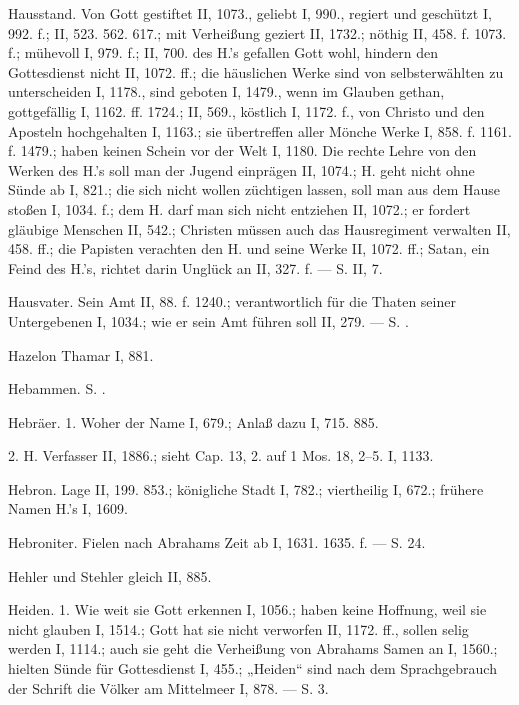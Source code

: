 Hausstand. Von Gott gestiftet II, 1073., geliebt I, 990., regiert und geschützt I, 992. f.; II, 523. 562. 617.; mit Verheißung geziert II, 1732.; nöthig II, 458. f. 1073. f.; mühevoll I, 979. f.; II, 700.  des H.’s gefallen Gott wohl, hindern den Gottesdienst nicht II, 1072. ff.; die häuslichen Werke sind von selbsterwählten zu unterscheiden I, 1178., sind geboten I, 1479., wenn im Glauben gethan, gottgefällig I, 1162. ff. 1724.; II, 569., köstlich I, 1172. f., von Christo und den Aposteln hochgehalten I, 1163.; sie übertreffen aller Mönche Werke I, 858. f. 1161. f. 1479.; haben keinen Schein vor der Welt I, 1180. Die rechte Lehre von den Werken des H.’s soll man der Jugend einprägen II, 1074.; H. geht nicht ohne Sünde ab I, 821.; die sich nicht wollen züchtigen lassen, soll man aus dem Hause stoßen I, 1034. f.; dem H. darf man sich nicht entziehen II, 1072.; er fordert gläubige Menschen II, 542.; Christen müssen auch das Hausregiment verwalten II, 458. ff.; die Papisten verachten den H. und seine Werke II, 1072. ff.; Satan, ein Feind des H.’s, richtet darin Unglück an II, 327. f. — S.  II, 7.

Hausvater. Sein Amt II, 88. f. 1240.; verantwortlich für die Thaten seiner Untergebenen I, 1034.; wie er sein Amt führen soll II, 279. — S. .

Hazelon Thamar I, 881.

Hebammen. S. .

Hebräer. 1.  Woher der Name I, 679.; Anlaß dazu I, 715. 885.

2.  H. Verfasser II, 1886.; sieht Cap. 13, 2. auf 1 Mos. 18, 2–5. I, 1133.

Hebron. Lage II, 199. 853.; königliche Stadt I, 782.; viertheilig I, 672.; frühere Namen H.’s I, 1609.

Hebroniter. Fielen nach Abrahams Zeit ab I, 1631. 1635. f. — S.  24.

Hehler und Stehler gleich II, 885.

Heiden. 1.  Wie weit sie Gott erkennen I, 1056.; haben keine Hoffnung, weil sie nicht glauben I, 1514.; Gott hat sie nicht verworfen II, 1172. ff., sollen selig werden I, 1114.; auch sie geht die Verheißung von Abrahams Samen an I, 1560.; hielten Sünde für Gottesdienst I, 455.; „Heiden“ sind nach dem Sprachgebrauch der Schrift die Völker am Mittelmeer I, 878. — S.  3.


